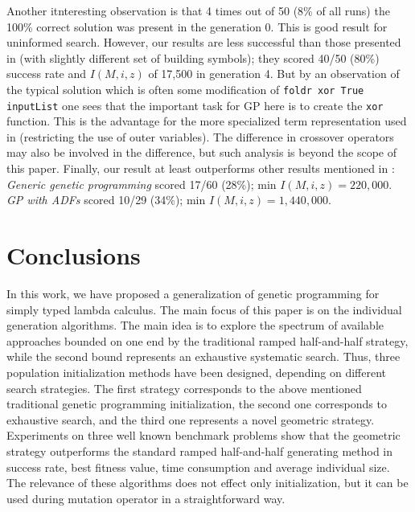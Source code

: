 \documentclass[conference]{IEEEtran}
\newcommand{\red}[1]{{\color{red} #1}}
\begin{document}
Another itnteresting observation is that 4 times out of 50 (8\% of all runs) 
the 100\% correct solution was present in the generation 0. This is good
result for uninformed search. However, our results are less successful 
than those presented in \cite{yu01} (with slightly different set of 
building symbols); they scored 40/50 (80\%) success rate and $I(M,i,z)$ of 
17,500 in generation 4. But by an observation of the typical solution which is often
some modification of \texttt{foldr xor True inputList} one sees that the important 
task for GP here is to create the \texttt{xor} function. This is the advantage for the 
more specialized term representation used in \cite{yu01} 
(restricting the use of outer variables). 
The difference in crossover operators may also be involved in the difference, 
but such analysis is beyond the scope of this paper. 
Finally, our result at least outperforms other results mentioned in \cite{yu01}: \textit{Generic genetic programming} 
scored 17/60 (28\%); min $I(M,i,z) = 220,000$. \textit{GP with ADFs} 
scored 10/29 (34\%); min $I(M,i,z) = 1,440,000$.

\section{Conclusions}
\label{conclusions}

In this work, we have proposed a generalization of genetic programming 
for simply typed lambda calculus. The main focus of this paper is on the individual generation algorithms. 
The main idea is to explore the spectrum of available approaches bounded on one end by the traditional
ramped half-and-half strategy, while the second bound represents an exhaustive systematic search. 
Thus, three population initialization methods have been designed, 
depending on different search strategies. 
The first strategy corresponds to the above mentioned traditional genetic programming initialization,  
the second one corresponds to exhaustive search, and the third one 
represents a novel geometric strategy.
Experiments on three well 
known benchmark problems show
that the geometric strategy outperforms
the standard ramped half-and-half 
generating method in success rate, best fitness value,
time consumption and average individual size.
The relevance of these algorithms does not effect only initialization, but it can be used during mutation
operator in a straightforward way. 
\end{document}

